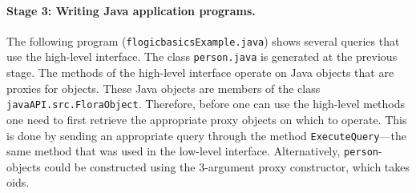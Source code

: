 \paragraph{Stage 3: Writing Java application programs.}

The following program ({\tt flogicbasicsExample.java}) shows several
queries that use the high-level interface. The
class {\tt person.java} is generated at the previous stage.
The methods of the high-level interface operate on Java objects that are
proxies for \FLORA objects. These Java objects are members of the class
{\tt javaAPI.src.FloraObject}.
Therefore, before one can use the high-level methods one need to first
retrieve the appropriate proxy objects on which to operate. This is done
by sending an appropriate query through the method {\tt ExecuteQuery}---the
same method that was used in the low-level interface.
Alternatively, {\tt person}-objects could be constructed using the
3-argument proxy constructor, which takes \fl oids.


